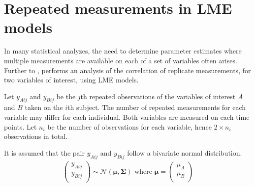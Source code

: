 \documentclass[12pt, a4paper]{report}
\theoremstyle{plain}
\theoremstyle{definition}
\theoremstyle{remark}
\begin{document}
			
			
			
			
			
			
			\section{Repeated measurements in LME models}
			
			In many statistical analyzes, the need to determine parameter estimates where multiple measurements are available on each of a set of variables often arises. Further to \citet{lam}, \citet{hamlett} performs an analysis of the correlation of replicate measurements, for two variables of interest, using LME models.
			
			Let $y_{Aij}$ and $y_{Bij}$ be the $j$th repeated observations of the variables of interest $A$ and $B$ taken on the $i$th subject. The number of repeated measurements for each variable may differ for each individual.
			Both variables are measured on each time points. Let $n_{i}$ be the number of observations for each variable, hence $2\times n_{i}$ observations in total.
			
			It is assumed that the pair $y_{Aij}$ and $y_{Bij}$ follow a bivariate normal distribution.
			\begin{eqnarray*}
				\left(
				\begin{array}{c}
					y_{Aij} \\
					y_{Bij} \\
				\end{array}
				\right) \sim \mathcal{N}(
				\boldsymbol{\mu}, \boldsymbol{\Sigma})\mbox{   where } \boldsymbol{\mu} = \left(
				\begin{array}{c}
					\mu_{A} \\
					\mu_{B} \\
				\end{array}
				\right)
			\end{eqnarray*}
			
\end{document}
